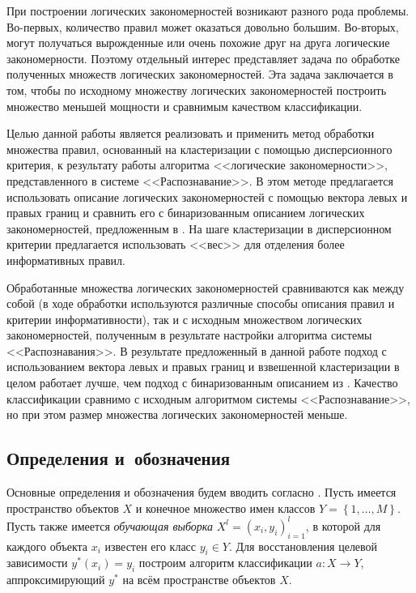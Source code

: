 \documentclass[12pt]{article}
\begin{document}
При построении логических закономерностей возникают разного рода
проблемы. Во-первых, количество правил может оказаться довольно
большим. Во-вторых, могут получаться вырожденные или очень похожие
друг на друга логические закономерности. Поэтому отдельный интерес
представляет задача по обработке полученных множеств логических
закономерностей. Эта задача заключается в том, чтобы по исходному
множеству логических закономерностей построить множество меньшей
мощности и сравнимым качеством классификации.

Целью данной работы является реализовать и применить метод обработки
множества правил, основанный на кластеризации с помощью дисперсионного
критерия, к результату работы алгоритма <<логические закономерности>>,
представленного в системе <<Распознавание>>. В этом методе
предлагается использовать описание логических закономерностей с
помощью вектора левых и правых границ и сравнить его с бинаризованным
описанием логических закономерностей, предложенным в
\cite{novikov15}. На шаге кластеризации в дисперсионном критерии
предлагается использовать <<вес>> для отделения более информативных
правил.

Обработанные множества логических закономерностей сравниваются как
между собой (в ходе обработки используются различные способы описания
правил и критерии информативности), так и с исходным множеством
логических закономерностей, полученным в результате настройки
алгоритма системы <<Распознавания>>. В результате предложенный в
данной работе подход с использованием вектора левых и правых границ и
взвешенной кластеризации в целом работает лучше, чем подход с
бинаризованным описанием из \cite{novikov15}. Качество
классификации сравнимо с исходным алгоритмом системы
<<Распознавание>>, но при этом размер множества логических
закономерностей меньше.

\subsection{Определения и~обозначения}
\label{subsec:defs}



Основные определения и обозначения будем вводить согласно
\cite{voron10logicalgs}. Пусть имеется пространство объектов \(X\) и
конечное множество имен классов \(Y = \left\{1, \dots,
M\right\}\). Пусть также имеется \emph{обучающая выборка} \(X^{l} =
(x_i, y_i)_{i = 1}^{l}\), в которой для каждого объекта \(x_i\)
известен его класс \(y_i \in Y\).  Для восстановления целевой
зависимости \(y^{*}(x_i) = y_i\) построим алгоритм классификации
\(a\colon X \rightarrow Y\), аппроксимирующий \(y^{*}\) на всём
пространстве объектов \(X\).
\end{document}
